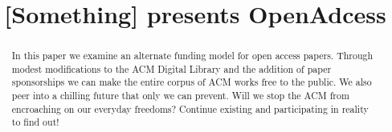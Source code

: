 \documentclass[sigtbd]{sigtbd17-style}
\newcommand{\todo}[1]
{{\bf\color{red}[#1]}}
\begin{document}
\title{\todo{Something} presents OpenAdcess}
\maketitle

\begin{abstract}
  In this paper we examine an alternate funding model for open access papers.
  Through modest modifications to the ACM Digital Library and the addition of
  paper sponsorships we can make the entire corpus of ACM works free to the
  public.
  We also peer into a chilling future that only we can prevent.
  Will we stop the ACM from encroaching on our everyday freedoms?
  Continue existing and participating in reality to find out!
\end{abstract}












\end{document}

